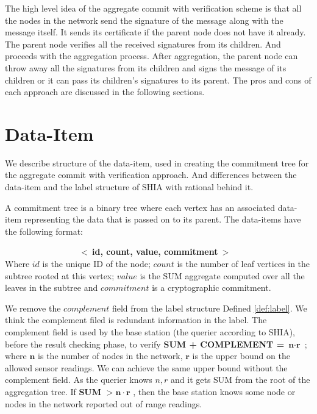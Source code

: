 	The high level idea of the aggregate commit with verification scheme is that all the nodes in the network send the signature of the message along with the message itself. 
	It sends its certificate if the parent node does not have it already.
	The parent node verifies all the received signatures from its children.
	And proceeds with the aggregation process.
	After aggregation, the parent node can throw away all the signatures from its children and signs the message of its children or it can pass its children's signatures to its parent. 
	The pros and cons of each approach are discussed in the following sections. 

\section{Data-Item}
	
	We describe structure of the data-item, used in creating the commitment tree for the aggregate commit with verification approach. And differences between the data-item and the label structure of SHIA with rational behind it.
	\begin{definition}
		\label{def:data-item}
		A commitment tree is a binary tree where each vertex has an associated data-item representing the data that is passed on to its parent. The data-items have the following format:

		$\hspace{100pt}$ \textbf{$<\ $id, count, value, commitment$\ >$}\\
	Where $id$ is the unique ID of the node; $count$ is the number of leaf vertices in the subtree rooted at this vertex; $value$ is the SUM aggregate computed over all the leaves in the subtree and $commitment$ is a cryptographic commitment.
	\end{definition}
	
	We remove the $complement$ field from the label structure Defined \ref{def:label}. 
	We think the complement filed is redundant information in the label. 
	The complement field is used by the base station (the querier according to SHIA), before the result checking phase, to verify \textbf{SUM + COMPLEMENT =} $\textbf{n} \cdot \textbf{r}$ ; where $\textbf{n}$ is the number of nodes in the network, $\textbf{r}$ is the upper bound on the allowed sensor readings.
	We can achieve the same upper bound without the complement field.
	As the querier knows $n, r$ and it gets SUM from the root of the aggregation tree.
	If \textbf{SUM} $> \textbf{n} \cdot \textbf{r}$ , then the base station knows some node or nodes in the network reported out of range readings.

